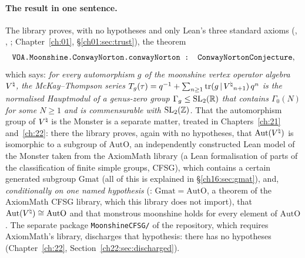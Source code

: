 \paragraph{The result in one sentence.}  The library proves, with no hypotheses and only Lean's three standard
axioms (, , ; Chapter~\ref{ch:01}, \S\ref{ch01:sec:trust}), the theorem
\begin{equation*}
  \lean{VOA.Moonshine.ConwayNorton.conwayNorton : ConwayNortonConjecture},
\end{equation*}
which says: \emph{for every automorphism $g$ of the moonshine vertex operator algebra ${V^{\natural}}$, the McKay--Thompson
series $T_g(\tau)=q^{-1}+\sum_{n\ge1}\operatorname{tr}(g\,|\,{V^{\natural}}_{n+1})\,q^n$ is the normalised Hauptmodul of a genus-zero group
$\Gamma_g\le\mathrm{SL}_2(\mathbb{R})$ that contains $\Gamma_0(N)$ for some $N\ge1$ and is commensurable with $\mathrm{SL}_2(\mathbb{Z})$.}
That the automorphism group of ${V^{\natural}}$ is the Monster is a separate matter, treated in Chapters~\ref{ch:21}
and~\ref{ch:22}: there the library proves, again with no hypotheses, that $\operatorname{Aut}({V^{\natural}})$ is isomorphic to a subgroup
of $\mathrm{AutO}$, an independently constructed Lean model of the Monster taken from the AxiomMath library (a Lean
formalisation of parts of the classification of finite simple groups, CFSG), which contains a certain generated
subgroup $\mathrm{Gmat}$ (all of this is explained in \S\ref{ch16:sec:gmat}), and,
\emph{conditionally on one named hypothesis} (: $\mathrm{Gmat}=\mathrm{AutO}$, a theorem of the
AxiomMath CFSG library, which this library does not import), that $\operatorname{Aut}({V^{\natural}})\cong\mathrm{AutO}$ and
that monstrous moonshine holds for every element of $\mathrm{AutO}$.  The separate package \texttt{MoonshineCFSG/} of
the repository, which requires AxiomMath's library, discharges that hypothesis: there
 has no hypotheses (Chapter~\ref{ch:22}, Section~\ref{ch22:sec:discharged}).

